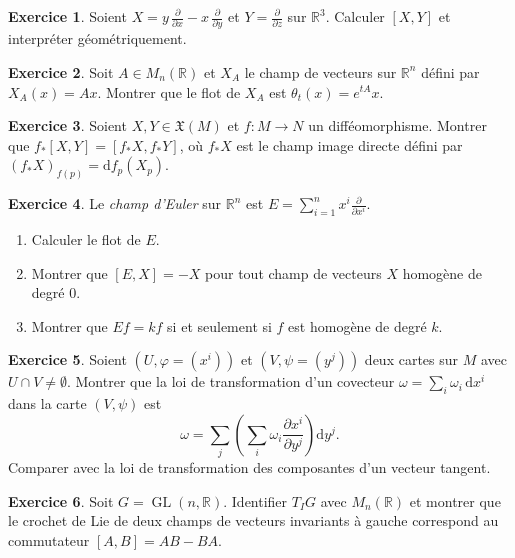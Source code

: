 \documentclass[12pt,a4paper,openany]{book}
\theoremstyle{definition}
\newtheorem{exercice}{Exercice}[chapter]
\theoremstyle{plain}
\theoremstyle{remark}
\newcommand{\R}{\mathbb{R}}
\DeclareMathOperator{\GL}{GL}
\newcommand{\dd}{\mathrm{d}}
\begin{document}
\begin{exercice}\label{exo:crochet-R3}
Soient $X = y\,\frac{\partial}{\partial x} - x\,\frac{\partial}{\partial y}$
et $Y = \frac{\partial}{\partial z}$ sur $\R^3$. Calculer $[X, Y]$ et interpréter
géométriquement.
\end{exercice}

\begin{exercice}\label{exo:flot-lineaire}
Soit $A \in M_n(\R)$ et $X_A$ le champ de vecteurs sur $\R^n$ défini par
$X_A(x) = Ax$. Montrer que le flot de $X_A$ est $\theta_t(x) = e^{tA} x$.
\end{exercice}

\begin{exercice}\label{exo:crochet-f}
Soient $X, Y \in \mathfrak{X}(M)$ et $f : M \to N$ un difféomorphisme.
Montrer que $f_*[X,Y] = [f_*X, f_*Y]$, où $f_*X$ est le champ image directe
défini par $(f_*X)_{f(p)} = \dd f_p(X_p)$.
\end{exercice}

\begin{exercice}\label{exo:euler}
Le \emph{champ d'Euler} sur $\R^n$ est $E = \sum_{i=1}^n x^i \frac{\partial}{\partial x^i}$.
\begin{enumerate}[label=(\alph*)]
  \item Calculer le flot de $E$.
  \item Montrer que $[E, X] = -X$ pour tout champ de vecteurs $X$ homogène de degré $0$.
  \item Montrer que $Ef = kf$ si et seulement si $f$ est homogène de degré $k$.
\end{enumerate}
\end{exercice}

\begin{exercice}\label{exo:cotangent-changement}
Soient $(U, \varphi = (x^i))$ et $(V, \psi = (y^j))$ deux cartes sur $M$ avec
$U \cap V \neq \emptyset$. Montrer que la loi de transformation d'un covecteur
$\omega = \sum_i \omega_i\,\dd x^i$ dans la carte $(V, \psi)$ est
\[
  \omega = \sum_j \left(\sum_i \omega_i \frac{\partial x^i}{\partial y^j}\right) \dd y^j.
\]
Comparer avec la loi de transformation des composantes d'un vecteur tangent.
\end{exercice}

\begin{exercice}\label{exo:lie-matrice}
Soit $G = \GL(n, \R)$\index{GL(n,R)@$\GL(n,\R)$}. Identifier $T_I G$ avec $M_n(\R)$
et montrer que le crochet de Lie de deux champs de vecteurs invariants à gauche correspond
au commutateur $[A, B] = AB - BA$.
\end{exercice}
\end{document}
